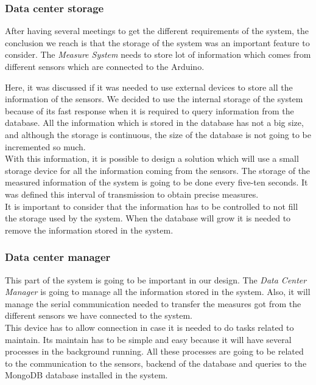 \subsubsection{Data center storage}

After having several meetings to get the different requirements of the system, the conclusion we reach is that the storage of the system was an important feature to consider. The \textit{Measure System} needs to store lot of information which comes from  different sensors which are connected to the Arduino.

Here, it was discussed if it was needed to use external devices to store all the information of the sensors. We decided to use the internal storage of the system because of its fast response when it is required to query information from the database. All the information which is stored in the database has not a big size, and although the storage is continuous, the size of the database is not going to be incremented so much.\\

With this information, it is possible to design a solution which will use a small storage device for all the information coming from the sensors. The storage of the measured information of the system is going to be done every five-ten seconds. It was defined this interval of transmission to obtain precise measures.\\

It is important to consider that the information has to be controlled to not fill the storage used by the system. When the database will grow it is needed to remove the information stored in the system. 

\subsubsection{Data center manager}

This part of the system is going to be important in our design. The \textit{Data Center Manager} is going to manage all the information stored in the system. Also, it will manage the serial communication needed to transfer the measures got from the different sensors we have connected to the system.\\

This device has to allow connection in case it is needed to do tasks related to maintain. Its maintain has to be simple and easy because it will have several processes in the background running. All these processes are going to be related to the communication to the sensors, backend \cite{backend} of the database and queries to the MongoDB database installed in the system.\\

